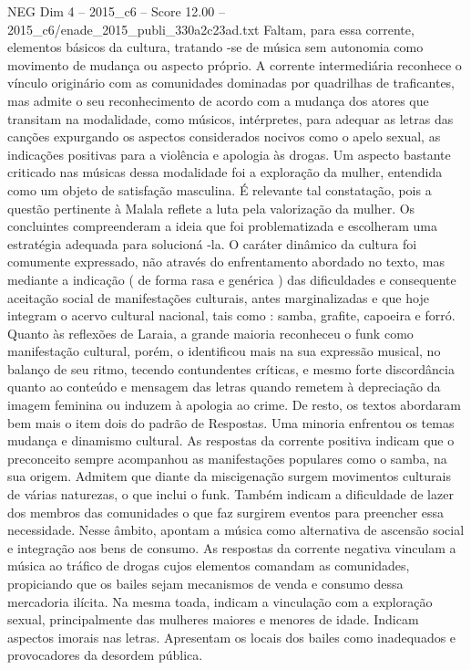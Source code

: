 \begin{textsample}{NEG Dim 4 – 2015\_c6 – Score 12.00 – 2015\_c6/enade\_2015\_publi\_330a2c23ad.txt}
Faltam, para essa corrente, elementos básicos da cultura, tratando -se de música sem autonomia como movimento de mudança ou aspecto próprio.
A corrente intermediária reconhece o vínculo originário com as comunidades dominadas por quadrilhas de traficantes, mas admite o seu reconhecimento de acordo com a mudança dos atores que transitam na modalidade, como músicos, intérpretes, para adequar as letras das canções expurgando os aspectos considerados nocivos como o apelo sexual, as indicações positivas para a violência e apologia às drogas.
Um aspecto bastante criticado nas músicas dessa modalidade foi a exploração da mulher, entendida como um objeto de satisfação masculina.
É relevante tal constatação, pois a questão pertinente à Malala reflete a luta pela valorização da mulher.
Os concluintes compreenderam a ideia que foi problematizada e escolheram uma estratégia adequada para solucioná -la.
O caráter dinâmico da cultura foi comumente expressado, não através do enfrentamento abordado no texto, mas mediante a indicação ( de forma rasa e genérica ) das dificuldades e consequente aceitação social de manifestações culturais, antes marginalizadas e que hoje integram o acervo cultural nacional, tais como : samba, grafite, capoeira e forró.
Quanto às reflexões de Laraia, a grande maioria reconheceu o funk como manifestação cultural, porém, o identificou mais na sua expressão musical, no balanço de seu ritmo, tecendo contundentes críticas, e mesmo forte discordância quanto ao conteúdo e mensagem das letras quando remetem à depreciação da imagem feminina ou induzem à apologia ao crime.
De resto, os textos abordaram bem mais o item dois do padrão de Respostas.
Uma minoria enfrentou os temas mudança e dinamismo cultural.
As respostas da corrente positiva indicam que o preconceito sempre acompanhou as manifestações populares como o samba, na sua origem.
Admitem que diante da miscigenação surgem movimentos culturais de várias naturezas, o que inclui o funk.
Também indicam a dificuldade de lazer dos membros das comunidades o que faz surgirem eventos para preencher essa necessidade.
Nesse âmbito, apontam a música como alternativa de ascensão social e integração aos bens de consumo.
As respostas da corrente negativa vinculam a música ao tráfico de drogas cujos elementos comandam as comunidades, propiciando que os bailes sejam mecanismos de venda e consumo dessa mercadoria ilícita.
Na mesma toada, indicam a vinculação com a exploração sexual, principalmente das mulheres maiores e menores de idade.
Indicam aspectos imorais nas letras.
Apresentam os locais dos bailes como inadequados e provocadores da desordem pública.

\end{textsample}
